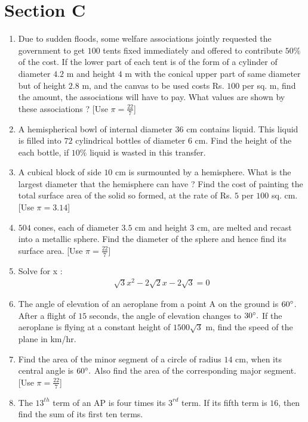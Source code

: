 \documentclass[journal,12pt,twocolumn]{IEEEtran}
\renewcommand\thesection{\arabic{section}}
\begin{document}
\section{Section C}
\renewcommand{\theequation}{\theenumi}
\begin{enumerate}[label=\thesection.\arabic*.,ref=\thesection.\theenumi]
\item Due to sudden floods, some welfare associations jointly requested the government to get $100$ tents fixed immediately and offered to contribute $ 50\% $ of the cost. If the lower part of each tent is of the form of a cylinder of diameter $4.2$ m and height $4$ m with the conical upper part of same diameter but of height $2.8$ m, and the canvas to be used costs Rs. $100$ per sq. m, find the amount, the associations will have to pay. What values are shown by these associations ? [Use $\pi=\frac{22}{7}$]
\item A hemispherical bowl of internal diameter $36$ cm contains liquid. This liquid is filled into $72$ cylindrical bottles of diameter $6$ cm. Find the height of the each bottle, if $10 \% $ liquid is wasted in this transfer.
\item A cubical block of side $10$ cm is surmounted by a hemisphere. What is the largest diameter that the hemisphere can have ? Find the cost of painting the total surface area of the solid so formed, at the rate of Rs. $5$ per $100$ sq. cm. [Use $\pi= 3.14$]
\item $504$ cones, each of diameter $3.5$ cm and height $3$ cm, are melted and recast into a metallic sphere. Find the diameter of the sphere and hence find its surface area. [Use $\pi=\frac{22}{7}$]
\item Solve for x :
 \begin{align}
     \sqrt{3}x^2 -2\sqrt{2}x-2\sqrt{3}= 0 
 \end{align}
\item The angle of elevation of an aeroplane from a point A on the ground is $60 \degree  $. After a flight of $15$ seconds, the angle of elevation changes to $  30 \degree.$ If the aeroplane is flying at a constant height of $1500\sqrt{3}$ m, find the speed of the plane in km/hr.
\item Find the area of the minor segment of a circle of radius $14$ cm, when its central angle is $60 \degree.$ Also find the area of the corresponding major segment. [Use $\pi =\frac{22}{7}$]
\item The $13^{th}$ term of an AP is four times its $3^{rd}$ term. If its fifth term is $16$, then find the sum of its first ten terms.

\end{enumerate}
\end{document}
